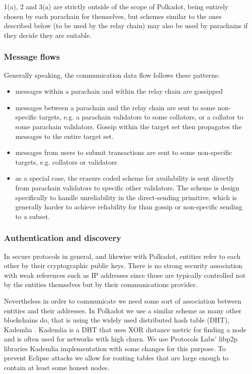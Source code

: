 1(a), 2 and 3(a) are strictly outside of the scope of Polkadot, being entirely chosen by each parachain for themselves, but schemes similar to the ones described below (to be used by the relay chain) may also be used by parachains if they decide they are suitable.

\subsubsection{Message flows}

Generally speaking, the communication data flow follows these patterns:

\begin{itemize}
\item messages within a parachain and within the relay chain are gossipped
\item messages between a parachain and the relay chain are sent to some non-specific targets, e.g. a parachain validators to some collators, or a collator to some parachain validators. Gossip within the target set then propagates the messages to the entire target set.
\item messages from users to submit transactions are sent to some non-specific targets, e.g. collators or validators
\item as a special case, the erasure coded scheme for availability is sent directly from parachain validators to specific other validators. The scheme is design specifically to handle unreliability in the direct-sending primitive, which is generally harder to achieve reliability for than gossip or non-specific sending to a subset.
\end{itemize}

\subsubsection{Authentication and discovery}

In secure protocols in general, and likewise with Polkadot, entities refer to each other by their cryptographic public keys. There is no strong security association with weak references such as IP addresses since those are typically controlled not by the entities themselves but by their communications provider.

Nevertheless in order to communicate we need some sort of association between entities and their addresses. In Polkadot we use a similar scheme as many other blockchains do, that is using the widely used distributed hash table (DHT), Kademlia \cite{Maymounkov:2002:Kademila}. Kademlia is a DHT that uses XOR distance metric for finding a node and is often used for networks with high churn. We use Protocols Labs' libp2p libraries  Kademlia implementation with some changes for this purpose. To prevent Eclipse attacks  we allow for routing tables that are large enough to contain at least some honest nodes.

